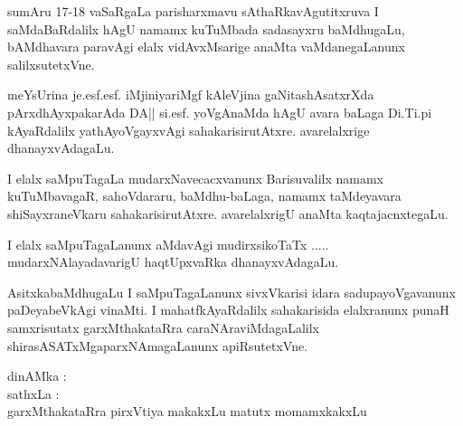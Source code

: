sumAru 17-18 vaSaRgaLa parisharxmavu sAthaRkavAgutitxruva I saMdaBaRdalilx hAgU namamx kuTuMbada sadasayxru baMdhugaLu, bAMdhavara paravAgi elalx vidAvxMsarige anaMta vaMdanegaLanunx salilxsutetxVne. 

meYsUrina je.esf.esf. iMjiniyariMgf kAleVjina gaNitashAsatxrXda pArxdhAyxpaka\-rAda DA|| si.esf. yoVgAnaMda hAgU avara baLaga Di.Ti.pi kAyaRdalilx yathAyoVgayxvAgi sahakarisirutAtxre. avarelalxrige dhanayxvAdagaLu. 

I elalx saMpuTagaLa mudarxNavecacxvanunx Barisuvalilx namamx kuTuMbavagaR, sahoVdararu, baMdhu-baLaga, namamx taMdeyavara shiSayxraneVkaru sahakarisirutAtxre. avarelalxrigU anaMta kaqtajacnxtegaLu. 

I elalx saMpuTagaLanunx aMdavAgi mudirxsikoTaTx ..... mudarxNAlayadavarigU haqtUpxvaRka dhanayxvAdagaLu.

AsitxkabaMdhugaLu I saMpuTagaLanunx sivxVkarisi idara sadupayoVgavanunx paDeyabeVkAgi vinaMti. I mahatfkAyaRdalilx sahakarisida elalxranunx punaH samxrisutatx garxMthakataRra caraNAraviMdagaLalilx shirasASATxMgaparxNAmagaLanunx apiRsutetxVne.

\bigskip

\noindent dinAMka : \\
sathxLa : \\
garxMthakataRra pirxVtiya makakxLu matutx momamxkakxLu
